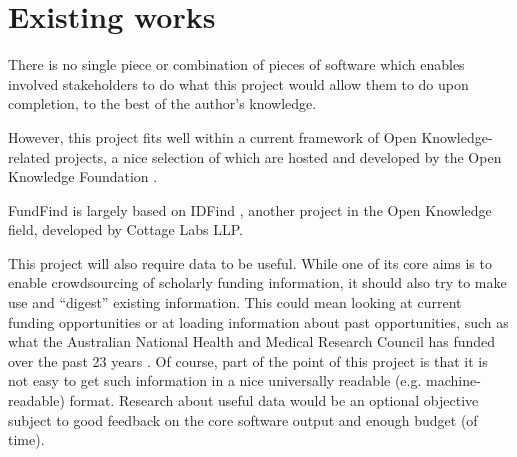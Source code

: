\section{Existing works}
There is no single piece or combination of pieces of software which enables involved stakeholders to do what this project would allow them to do upon completion, to the best of the author's knowledge.

However, this project fits well within a current framework of Open Knowledge-related projects, a nice selection of which are hosted and developed by the Open Knowledge Foundation \cite{okfn-labs} \cite{okfn-github}.

FundFind is largely based on IDFind \cite{idfind}, another project in the Open Knowledge field, developed by Cottage Labs LLP.

This project will also require data to be useful. While one of its core aims is to enable crowdsourcing of scholarly funding information, it should also try to make use and ``digest'' existing information. This could mean looking at current funding opportunities \cite{rcuk-india} \cite{ahrc-opps} \cite{bbsrc-opps} \cite{epsrc-opps} or at loading information about past opportunities, such as what the Australian National Health and Medical Research Council has funded over the past 23 years \cite{au-nhmrc}. Of course, part of the point of this project is that it is not easy to get such information in a nice universally readable (e.g. machine-readable) format. Research about useful data would be an optional objective subject to good feedback on the core software output and enough budget (of time).


